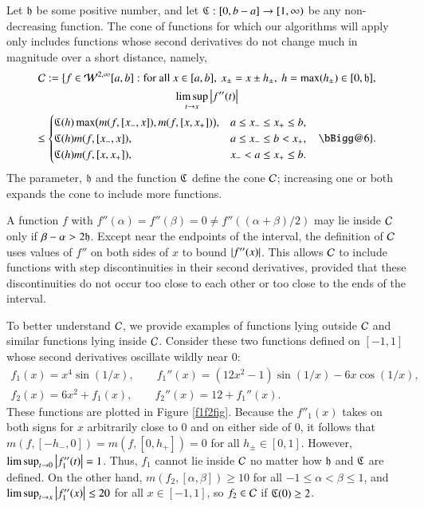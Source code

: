 \documentclass[review]{elsarticle}
\makeatletter
\newcommand{\Vast}{\bBigg@{6}}
\newcommand{\Vastr}{\mathclose\Vast}
\makeatother
\begin{document}
Let $\mathfrak{h}$ be some positive number, and let $\mathfrak{C} : [0,b-a] \to [1,\infty)$ be any non-decreasing function.  The cone of functions for which our algorithms will apply only includes functions whose second derivatives do not change much in magnitude over a short distance, namely, 
\begin{multline} \label{conedef}
\cc : = \bigl \{ f \in \cw^{2,\infty}[a,b] : \text{for all }x \in [a,b], \ x_\pm = x \pm h_\pm, \ h = \max(h_{\pm}) \in [0, \fh], \\  \limsup_{t \to x}\abs{f''(t)} \\
\le \begin{cases} \fC(h) \max\bigl(m(f,[x_-,x]),m(f,[x,x_+])\bigr), & a \le x_- \le x_+ \le b,\\
\fC(h) m(f,[x_-,x]), & a \le x_- \le b <  x_+, \\
\fC(h) m(f,[x,x_+]), & x_- < a \le x_+ \le b.
\end{cases} \quad
 \Vastr \}.
\end{multline}
The parameter, $\mathfrak{h}$ and the function $\mathfrak{C}$ define the cone $\mathcal{C}$;  increasing one or both expands the cone to include more functions.  

A function $f$ with $f''(\alpha) = f''(\beta) = 0 \ne f''((\alpha+\beta)/2)$  may lie inside $\mathcal{C}$ only if $\beta - \alpha > 2\mathfrak{h}$.  Except near the endpoints of the interval, the definition of $\mathcal{C}$ uses values of $f''$ on both sides of $x$ to bound $\left \lvert f''(x) \right \rvert$.   This allows $\mathcal{C}$ to include functions with step discontinuities in their second derivatives, provided that these discontinuities do not occur too close to each other or too close to the ends of the interval.

To better understand $\mathcal{C}$, we provide examples of functions lying outside $\mathcal{C}$ and similar functions lying inside $\mathcal{C}$.  Consider  these two functions defined on $[-1,1]$ whose second derivatives oscillate wildly near $0$: 
\begin{gather*}
f_1(x) = x^4 \sin(1/x), \qquad f_1''(x) = (12x^2 - 1) \sin(1/x) -6 x \cos(1/x), \\
f_2(x) = 6 x^2 + f_1(x), \qquad f_2''(x) = 12 + f_1''(x).
\end{gather*}
These functions are plotted in Figure \ref{f1f2fig}. Because the $f''_1(x)$ takes on both signs for $x$ arbitrarily close to $0$ and on either side of $0$, it follows that $m(f,[-h_-,0]) = m(f,[0,h_+]) = 0$ for all $h_\pm \in [0,1]$.  However, $\limsup_{t \to 0} \left \lvert f''_1(t) \right \rvert = 1$.  Thus, $f_1$ cannot lie inside $\mathcal{C}$ no matter how $\mathfrak{h}$ and $\mathfrak{C}$ are defined.    On the other hand,  $m(f_2,[\alpha, \beta]) \ge 10$ for all $-1 \le \alpha < \beta \le 1$, and $\limsup_{t \to x} \left \lvert f''_1(x) \right \rvert \le 20$ for all $x \in [-1,1]$, so $f_2 \in \mathcal{C}$ if $\mathfrak{C}(0) \ge 2$.
\end{document}
